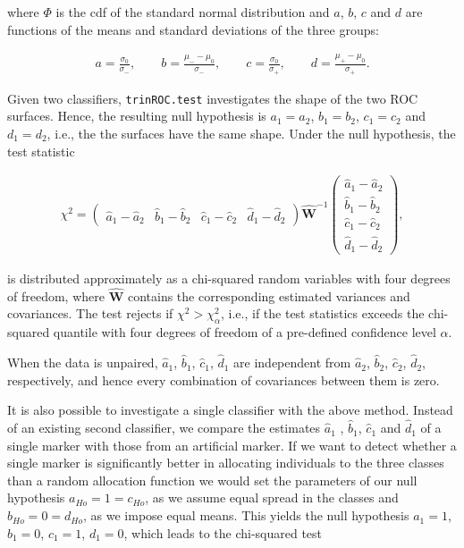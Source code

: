 \documentclass[
]{article}
\begin{document}
where \(\Phi\) is the cdf of the standard normal distribution and \(a\),
\(b\), \(c\) and \(d\) are functions of the means and standard
deviations of the three groups:

\begin{align*} 
a = \frac{{\sigma}_0}{{\sigma}_-}, \qquad b = \frac{ {\mu}_- - {\mu}_0}{{\sigma}_-}, \qquad 
c = \frac{{\sigma}_0}{{\sigma}_+}, \qquad d =  \frac{ {\mu}_+ - {\mu}_0}{{\sigma}_+}.
\end{align*}

Given two classifiers, \texttt{trinROC.test} investigates the shape of
the two ROC surfaces. Hence, the resulting null hypothesis is
\(a_1=a_2\), \(b_1=b_2\), \(c_1=c_2\) and \(d_1=d_2\), i.e., the the
surfaces have the same shape. Under the null hypothesis, the test
statistic

\begin{align*} 
 \chi^2 =  
 \begin{pmatrix} \widehat{a}_1 - \widehat{a}_2 &\widehat{b}_1 -\widehat{b}_2 & \widehat{c}_1-\widehat{c}_2 & \widehat{d}_1-\widehat{d}_2 \end{pmatrix}
 { \widehat{\boldsymbol{W}}}^{-1}
   \begin{pmatrix} \widehat{a}_1 - \widehat{a}_2 \\
    \widehat{b}_1 - \widehat{b}_2 \\ \widehat{c}_1-\widehat{c}_2 \\ \widehat{d}_1- \widehat{d}_2 \end{pmatrix},
\end{align*}

is distributed approximately as a chi-squared random variables with four
degrees of freedom, where \(\widehat{\boldsymbol{W}}\) contains the
corresponding estimated variances and covariances. The test rejects if
\(\chi^2 > \chi_{\alpha}^2\), i.e., if the test statistics exceeds the
chi-squared quantile with four degrees of freedom of a pre-defined
confidence level \(\alpha\).

When the data is unpaired, \(\widehat{a}_1\), \(\widehat{b}_1\),
\(\widehat{c}_1\), \(\widehat{d}_1\) are independent from
\(\widehat{a}_2\), \(\widehat{b}_2\), \(\widehat{c}_2\),
\(\widehat{d}_2\), respectively, and hence every combination of
covariances between them is zero.

It is also possible to investigate a single classifier with the above
method. Instead of an existing second classifier, we compare the
estimates \(\widehat{a}_1\) , \(\widehat{b}_1\), \(\widehat{c}_1\) and
\(\widehat{d}_1\) of a single marker with those from an artificial
marker. If we want to detect whether a single marker is significantly
better in allocating individuals to the three classes than a random
allocation function we would set the parameters of our null hypothesis
\(a_{Ho} = 1= c_{Ho}\), as we assume equal spread in the classes and
\(b_{Ho} = 0 = d_{Ho}\), as we impose equal means. This yields the null
hypothesis \(a_1=1\), \(b_1=0\), \(c_1=1\), \(d_1=0\), which leads to
the chi-squared test
\end{document}
